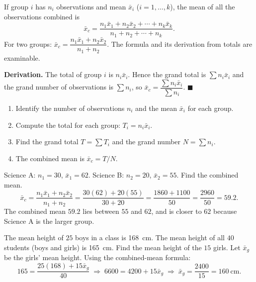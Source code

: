 \documentclass[11pt]{article}
\begin{document}
\begin{propriete}
If group $i$ has $n_i$ observations and mean $\bar{x}_i$ ($i=1,\dots,k$), the mean of all the observations combined is
\[
\bar{x}_c=\frac{n_1\bar{x}_1+n_2\bar{x}_2+\cdots+n_k\bar{x}_k}{n_1+n_2+\cdots+n_k}.
\]
For two groups: $\bar{x}_c=\dfrac{n_1\bar{x}_1+n_2\bar{x}_2}{n_1+n_2}$. The formula and its derivation from totals are examinable.
\end{propriete}

\textbf{Derivation.} The total of group $i$ is $n_i\bar{x}_i$. Hence the grand total is $\sum n_i\bar{x}_i$ and the grand number of observations is $\sum n_i$, so $\bar{x}_c=\dfrac{\sum n_i\bar{x}_i}{\sum n_i}$. \hfill$\blacksquare$

\begin{methode}
\begin{enumerate}
\item Identify the number of observations $n_i$ and the mean $\bar{x}_i$ for each group.
\item Compute the total for each group: $T_i = n_i \bar{x}_i$.
\item Find the grand total $T = \sum T_i$ and the grand number $N = \sum n_i$.
\item The combined mean is $\bar{x}_c = T / N$.
\end{enumerate}
\end{methode}

\begin{exoresolu}
Science A: $n_1=30$, $\bar{x}_1=62$. Science B: $n_2=20$, $\bar{x}_2=55$. Find the combined mean.
\tcblower
\[
\bar{x}_c=\frac{n_1\bar{x}_1+n_2\bar{x}_2}{n_1+n_2}
=\frac{30(62)+20(55)}{30+20}
=\frac{1860+1100}{50}
=\frac{2960}{50}=59.2.
\]
The combined mean $59.2$ lies between $55$ and $62$, and is closer to $62$ because Science A is the larger group.
\end{exoresolu}

\begin{exoresolu}
The mean height of $25$ boys in a class is \SI{168}{cm}. The mean height of all $40$ students (boys and girls) is \SI{165}{cm}. Find the mean height of the $15$ girls.
\tcblower
Let $\bar{x}_g$ be the girls' mean height. Using the combined-mean formula:
\[
165=\frac{25(168)+15\bar{x}_g}{40}
\;\Longrightarrow\;
6600=4200+15\bar{x}_g
\;\Longrightarrow\;
\bar{x}_g=\frac{2400}{15}=160\ \mathrm{cm}.
\]
\end{exoresolu}
\end{document}
